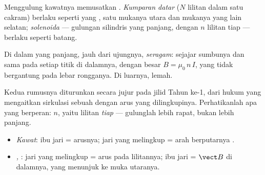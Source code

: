 \begin{definition}\label{def:g11:magnetic-fields:solenoid}
Menggulung kawatnya memusatkan . \emph{Kumparan
datar} ($N$ lilitan dalam satu cakram) berlaku seperti
 yang , satu mukanya utara dan mukanya yang lain selatan;
\emph{solenoida} --- gulungan silindris yang panjang,
dengan $n$ lilitan tiap  --- berlaku seperti  batang.
\end{definition}

\begin{proposition}\label{prop:g11:magnetic-fields:solenoidfield}
Di dalam  yang panjang, jauh dari ujungnya, 
\emph{seragam}: sejajar sumbunya dan sama pada setiap titik di
dalamnya, dengan besar $B = \mu_0\, n\, I$, yang tidak bergantung pada
lebar rongganya. Di luarnya,  lemah.
\end{proposition}
\admitted

\begin{remark}
Kedua rumusnya diturunkan secara jujur pada jilid Tahun ke-1, dari
hukum yang mengaitkan sirkulasi sebuah  dengan arus yang
dilingkupinya. Perhatikanlah apa yang berperan: $n$, yaitu lilitan
\emph{tiap } --- gulunglah lebih rapat, bukan lebih panjang.
\end{remark}

\begin{method}\label{met:g11:magnetic-fields:righthand}
\begin{itemize}
  \item \emph{Kawat}: ibu jari = arusnya; jari yang melingkup = arah
        berputarnya .
  \item \emph{, }: jari yang melingkup = arus pada
        lilitannya; ibu jari = $\vect B$ di dalamnya, yang menunjuk ke
        muka utaranya.
\end{itemize}
\end{method}

